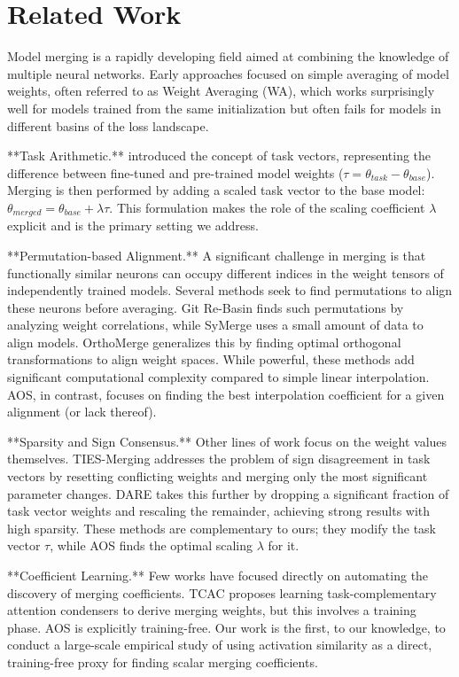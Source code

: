 \documentclass{article}
\theoremstyle{plain}
\theoremstyle{definition}
\theoremstyle{remark}
\begin{document}
\section{Related Work}

Model merging is a rapidly developing field aimed at combining the knowledge of multiple neural networks. Early approaches focused on simple averaging of model weights, often referred to as Weight Averaging (WA), which works surprisingly well for models trained from the same initialization but often fails for models in different basins of the loss landscape.

**Task Arithmetic.** \citet{ilharco2022editing} introduced the concept of task vectors, representing the difference between fine-tuned and pre-trained model weights ($\tau = \theta_{task} - \theta_{base}$). Merging is then performed by adding a scaled task vector to the base model: $\theta_{merged} = \theta_{base} + \lambda\tau$. This formulation makes the role of the scaling coefficient $\lambda$ explicit and is the primary setting we address.

**Permutation-based Alignment.** A significant challenge in merging is that functionally similar neurons can occupy different indices in the weight tensors of independently trained models. Several methods seek to find permutations to align these neurons before averaging. Git Re-Basin \citep{ainsworth2022git} finds such permutations by analyzing weight correlations, while SyMerge \citep{yadav2023symerge} uses a small amount of data to align models. OrthoMerge \citep{pena2024orthomerge} generalizes this by finding optimal orthogonal transformations to align weight spaces. While powerful, these methods add significant computational complexity compared to simple linear interpolation. AOS, in contrast, focuses on finding the best interpolation coefficient for a given alignment (or lack thereof).

**Sparsity and Sign Consensus.** Other lines of work focus on the weight values themselves. TIES-Merging \citep{yadav2023ties} addresses the problem of sign disagreement in task vectors by resetting conflicting weights and merging only the most significant parameter changes. DARE \citep{yu2023dare} takes this further by dropping a significant fraction of task vector weights and rescaling the remainder, achieving strong results with high sparsity. These methods are complementary to ours; they modify the task vector $\tau$, while AOS finds the optimal scaling $\lambda$ for it.

**Coefficient Learning.** Few works have focused directly on automating the discovery of merging coefficients. TCAC \citep{pan2024tcac} proposes learning task-complementary attention condensers to derive merging weights, but this involves a training phase. AOS is explicitly training-free. Our work is the first, to our knowledge, to conduct a large-scale empirical study of using activation similarity as a direct, training-free proxy for finding scalar merging coefficients.
\end{document}
